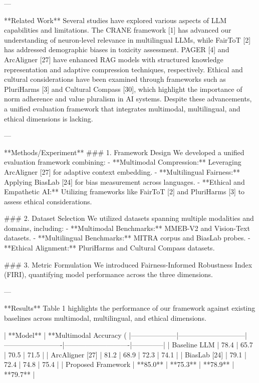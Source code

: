 ---

**Related Work**  
Several studies have explored various aspects of LLM capabilities and limitations. The CRANE framework [1] has advanced our understanding of neuron-level relevance in multilingual LLMs, while FairToT [2] has addressed demographic biases in toxicity assessment. PAGER [4] and ArcAligner [27] have enhanced RAG models with structured knowledge representation and adaptive compression techniques, respectively. Ethical and cultural considerations have been examined through frameworks such as PluriHarms [3] and Cultural Compass [30], which highlight the importance of norm adherence and value pluralism in AI systems. Despite these advancements, a unified evaluation framework that integrates multimodal, multilingual, and ethical dimensions is lacking.

---

**Methods/Experiment**  
### 1. Framework Design  
We developed a unified evaluation framework combining:  
- **Multimodal Compression:** Leveraging ArcAligner [27] for adaptive context embedding.  
- **Multilingual Fairness:** Applying BiasLab [24] for bias measurement across languages.  
- **Ethical and Empathetic AI:** Utilizing frameworks like FairToT [2] and PluriHarms [3] to assess ethical considerations.

### 2. Dataset Selection  
We utilized datasets spanning multiple modalities and domains, including:  
- **Multimodal Benchmarks:** MMEB-V2 and Vision-Text datasets.  
- **Multilingual Benchmarks:** MITRA corpus and BiasLab probes.  
- **Ethical Alignment:** PluriHarms and Cultural Compass datasets.

### 3. Metric Formulation  
We introduced Fairness-Informed Robustness Index (FIRI), quantifying model performance across the three dimensions.

---

**Results**  
Table 1 highlights the performance of our framework against existing baselines across multimodal, multilingual, and ethical dimensions.

| **Model**         | **Multimodal Accuracy (%
|--------------------|-----------------------------|-------------------------|----------------------------|--------------|
| Baseline LLM       | 78.4                        | 65.7                    | 70.5                       | 71.5         |
| ArcAligner [27]    | 81.2                        | 68.9                    | 72.3                       | 74.1         |
| BiasLab [24]       | 79.1                        | 72.4                    | 74.8                       | 75.4         |
| Proposed Framework | **85.0**                    | **75.3**                | **78.9**                   | **79.7**     |

